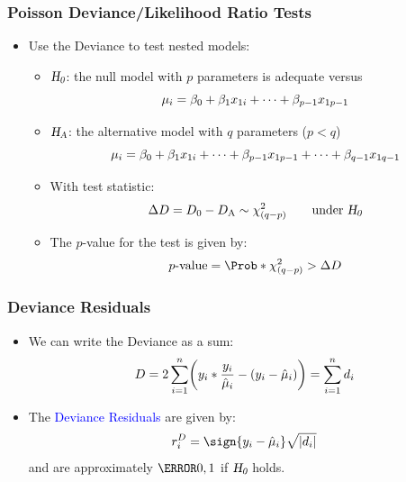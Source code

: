 \documentclass[oneside]{book}\usepackage[]{graphicx}\usepackage[svgnames]{xcolor}
\let\log\relax%
\newcommand{\HN}{\textsl{H}_{\textsl{0}}}%
\newcommand{\HA}{\textsl{H}_{\textsl{A}}}%
\DeclarePairedDelimiter\abs{\lvert}{\rvert}
\begin{document}
\subsubsection*{Poisson Deviance/Likelihood Ratio Tests}
\begin{itemize}
      \item Use the Deviance to test nested models:
            \begin{itemize}
                  \item $ \HN $: the null model with $ p $ parameters is adequate versus
                        \[ \log{\mu_i}=\beta_0+\beta_1x_{1i}+\cdots+\beta_{p-1}x_{1p-1} \]
                  \item $ \HA $: the alternative model with $ q $ parameters ($ p<q $)
                        \[ \log{\mu_i}=\beta_0+\beta_1x_{1i}+\cdots+\beta_{p-1}x_{1p-1}+\cdots+\beta_{q-1}x_{1q-1} \]
                  \item With test statistic:
                        \[ \Delta D=D_0-D_\text{A} \sim \chi^2_{(q-p)}\qquad\text{under $ \HN $} \]
                  \item The $p$-value for the test is given by:
                        \[ p\text{-value}=\Prob*{\chi^2_{(q-p)}>\Delta D} \]
            \end{itemize}
\end{itemize}
\subsubsection*{Deviance Residuals}
\begin{itemize}
      \item We can write the Deviance as a sum:
            \[ D=2 \sum_{i=1}^{n}\biggl(y_i\log*{\frac{y_i}{\hat{\mu}_i}}-(y_i-\hat{\mu}_i)\biggr)=\sum_{i=1}^{n} d_i \]
      \item The \textcolor{Blue}{Deviance Residuals} are given by:
            \[ r_i^D=\sign{y_i-\hat{\mu}_i}\sqrt{\abs{d_i}} \]
            and are approximately $ \N{0,1} $ if $ \HN $ holds.
\end{itemize}
\end{document}
